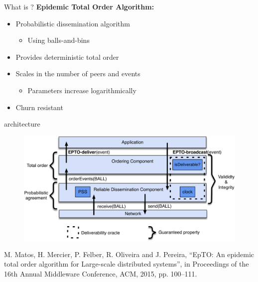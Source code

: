 \subtitle[Description]{Description}

\begin{frame}{What is \epto{}?}
	\textbf{Epidemic Total Order Algorithm:}
	\begin{itemize}
		\item Probabilistic dissemination algorithm
			\begin{itemize}
				\item Using balls-and-bins
			\end{itemize}
		\item Provides deterministic total order
		\item Scales in the number of peers and events
			\begin{itemize}
				\item Parameters increase logarithmically
			\end{itemize}
		\item Churn resistant
	\end{itemize}
\end{frame}


\begin{frame}{\epto{} architecture}
    \begin{figure}
        \includegraphics[scale=0.5]{figures/architecture}
    \end{figure}
\tiny{M. Matos, H. Mercier, P. Felber, R. Oliveira and J. Pereira, “EpTO: An epidemic total order algorithm for Large-scale distributed systems”, in Proceedings of the 16th Annual Middleware Conference, ACM, 2015, pp. 100–111.
}
\end{frame}

